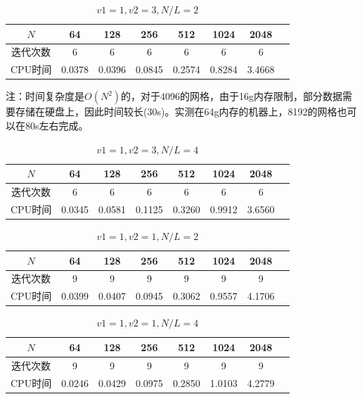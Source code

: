 \documentclass{article}
\begin{document}
\begin{table}[!h]
  \centering
  \caption{$v1 = 1, v2 = 3, N/L = 2$}
  \setlength{\belowcaptionskip}{-5pt} 
  \begin{tabular}{cccccccc}
    \toprule
    $N$ & 64 & 128 & 256 & 512 & 1024 & 2048 \\
    \midrule
    迭代次数 & 6 & 6 & 6 & 6 & 6 & 6 \\
    CPU时间 & 0.0378 & 0.0396 & 0.0845 & 0.2574 & 0.8284 & 3.4668 \\
    \bottomrule
  \end{tabular}
\end{table}
注：时间复杂度是$O(N^2)$的，对于4096的网格，由于16g内存限制，部分数据需要存储在硬盘上，因此时间较长(30s)。实测在64g内存的机器上，8192的网格也可以在80s左右完成。

\begin{table}[!h]
  \centering
  \caption{$v1 = 1, v2 = 3, N/L = 4$}
  \begin{tabular}{cccccccc}
    \toprule
    $N$ & 64 & 128 & 256 & 512 & 1024 & 2048 \\
    \midrule
    迭代次数 & 6 & 6 & 6 & 6 & 6 & 6 \\
    CPU时间 & 0.0345 & 0.0581 & 0.1125 & 0.3260 & 0.9912 & 3.6560 \\
    \bottomrule
  \end{tabular}
\end{table}
\vspace{-10pt}
\begin{table}[!h]
  \centering
  \caption{$v1 = 1, v2 = 1, N/L = 2$}
  \begin{tabular}{cccccccc}
    \toprule
    $N$ & 64 & 128 & 256 & 512 & 1024 & 2048 \\
    \midrule
    迭代次数 & 9 & 9 & 9 & 9 & 9 & 9 \\
    CPU时间 & 0.0399 & 0.0407 & 0.0945 & 0.3062 & 0.9557 & 4.1706  \\
    \bottomrule
  \end{tabular}
\end{table}

\begin{table}[!h]
  \centering
  \caption{$v1 = 1, v2 = 1, N/L = 4$}
  \begin{tabular}{cccccccc}
    \toprule
    $N$ & 64 & 128 & 256 & 512 & 1024 & 2048 \\
    \midrule
    迭代次数 & 9 & 9 & 9 & 9 & 9 & 9 \\
    CPU时间 & 0.0246 & 0.0429 & 0.0975 & 0.2850 & 1.0103 & 4.2779  \\
    \bottomrule
  \end{tabular}
\end{table}
\end{document}
